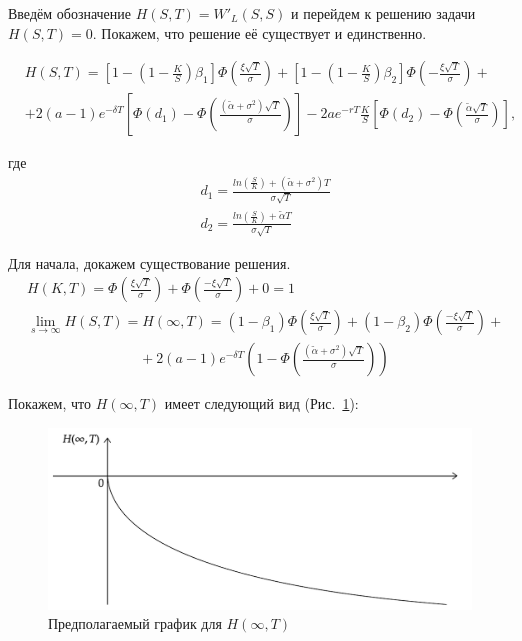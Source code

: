 \documentclass[oneside,final,12pt]{article}
\begin{document}
Введём обозначение $H(S,T)=W'_L(S,S)$ и перейдем к решению задачи $H(S,T)=0$. Покажем, что решение её существует и единственно.

\begin{align*}
    & H(S,T) = \left[ 1 - \left(1-\frac{K}{S} \right)\beta_1 \right] \Phi\left(\frac{\xi\sqrt{T}}{\sigma}\right)
    + \left[ 1 - \left(1-\frac{K}{S} \right)\beta_2 \right] \Phi\left(-\frac{\xi\sqrt{T}}{\sigma}\right) + \\
    & + 2(a-1)e^{-\delta T} \left[ \Phi\left(d_1\right) - \Phi\left(\frac{(\widetilde{\alpha}+\sigma^2)\sqrt{T}}{\sigma}\right) \right] - 2ae^{-rT}\frac{K}{S} \left[ \Phi\left(d_2\right) - \Phi\left(\frac{\widetilde{\alpha}\sqrt{T}}{\sigma}\right) \right],
\end{align*}

\noindent
где
\begin{align*}
    & d_1=\frac{ln\left(\frac{S}{K}\right)+(\widetilde{\alpha}+\sigma^2)T}{\sigma\sqrt{T}} \\
    & d_2 = \frac{ln\left(\frac{S}{K}\right)+\widetilde{\alpha}T}{\sigma\sqrt{T}}
\end{align*}


Для начала, докажем существование решения.
\begin{align*}
    & H(K,T)=\Phi\left(\frac{\xi\sqrt{T}}{\sigma}\right) + \Phi\left(\frac{-\xi\sqrt{T}}{\sigma}\right)+0=1 \\
    & \lim_{s\rightarrow\infty} H(S,T)=H(\infty,T)= (1-\beta_1)\Phi\left(\frac{\xi\sqrt{T}}{\sigma}\right) + (1-\beta_2)\Phi\left(\frac{-\xi\sqrt{T}}{\sigma}\right) + \\
    & \qquad\qquad\qquad\qquad+ 2(a-1)e^{-\delta T}\left( 1-\Phi\left(\frac{(\widetilde{\alpha}+\sigma^2)\sqrt{T}}{\sigma}\right)\right) 
\end{align*}

Покажем, что $H(\infty,T)$ имеет следующий вид (Рис.~\ref{h_infty_T}):

\begin{figure}[h]
    \centering
    \includegraphics[scale=0.7]{Graph6.pdf}
    \caption{Предполагаемый график для $H(\infty,T)$}
    \label{h_infty_T}
\end{figure}
\end{document}
